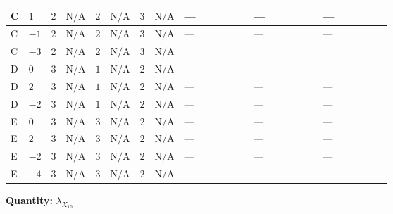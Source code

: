 \documentclass[8pt]{article}
\begin{document}
\begin{landscape}
\begin{longtable}{@{}llcccccc >{\raggedright\arraybackslash}p{0.21\linewidth} >{\raggedright\arraybackslash}p{0.21\linewidth} >{\raggedright\arraybackslash}p{0.21\linewidth}@{}}
\midrule
C & $1$ & $2$ & $\text{N/A}$ & $2$ & $\text{N/A}$ & $3$ & $\text{N/A}$ & --- & --- & --- \\
\midrule
C & $-1$ & $2$ & $\text{N/A}$ & $2$ & $\text{N/A}$ & $3$ & $\text{N/A}$ & --- & --- & --- \\
\midrule
C & $-3$ & $2$ & $\text{N/A}$ & $2$ & $\text{N/A}$ & $3$ & $\text{N/A}$ & \scriptsize\adjustbox{max width=\linewidth}{$\begin{gathered} {\lambda_{X_{10}}} (6 \operatorname{Tr}\!\left({Y_d}\,\left({Y_d}\right)^{\dagger}\right)+2 \operatorname{Tr}\!\left({Y_e}\,\left({Y_e}\right)^{\dagger}\right)+6 \operatorname{Tr}\!\left({Y_u}\,\left({Y_u}\right)^{\dagger}\right))\end{gathered}$} & \scriptsize\adjustbox{max width=\linewidth}{$\begin{gathered} -9 {g_2}^2 {\lambda_{X_{10}}}\end{gathered}$} & \scriptsize\adjustbox{max width=\linewidth}{$\begin{gathered} -3 {g_1}^2 {\lambda_{X_{10}}}\end{gathered}$} \\
\midrule
D & $0$ & $3$ & $\text{N/A}$ & $1$ & $\text{N/A}$ & $2$ & $\text{N/A}$ & --- & --- & --- \\
\midrule
D & $2$ & $3$ & $\text{N/A}$ & $1$ & $\text{N/A}$ & $2$ & $\text{N/A}$ & --- & --- & --- \\
\midrule
D & $-2$ & $3$ & $\text{N/A}$ & $1$ & $\text{N/A}$ & $2$ & $\text{N/A}$ & --- & --- & --- \\
\midrule
E & $0$ & $3$ & $\text{N/A}$ & $3$ & $\text{N/A}$ & $2$ & $\text{N/A}$ & --- & --- & --- \\
\midrule
E & $2$ & $3$ & $\text{N/A}$ & $3$ & $\text{N/A}$ & $2$ & $\text{N/A}$ & --- & --- & --- \\
\midrule
E & $-2$ & $3$ & $\text{N/A}$ & $3$ & $\text{N/A}$ & $2$ & $\text{N/A}$ & --- & --- & --- \\
\midrule
E & $-4$ & $3$ & $\text{N/A}$ & $3$ & $\text{N/A}$ & $2$ & $\text{N/A}$ & --- & --- & --- \\
\midrule
\bottomrule
\end{longtable}
\clearpage
\noindent\textbf{Quantity: }${\lambda_{X_{10}}}$\par\smallskip

\end{landscape}
\end{document}
